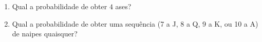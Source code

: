\documentclass[
  11pt]{report}
\begin{document}
\begin{itemize}
\begin{enumerate}

  \item
    Qual a probabilidade de obter $4$ ases?

  \item
    Qual a probabilidade de obter uma sequência (7 a J, 8 a Q, 9 a K, ou 10 a A) de naipes quaisquer?

\end{enumerate}
\end{itemize}
\end{document}
